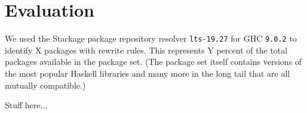 \section{Evaluation}
\label{sec:evaluation}

We used the Stackage package repository resolver \texttt{lts-19.27} for GHC \texttt{9.0.2} to identify X packages with rewrite rules. \cite{stackage} This represents Y percent of the total packages available in the package set. (The package set itself contains versions of the most popular Haskell libraries and many more in the long tail that are all mutually compatible.)

Stuff here...
